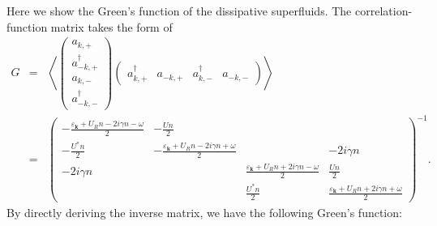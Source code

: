 \documentclass[aps,onecolumn,superscriptaddress,notitlepage,longbibliography]{revtex4-1}
\newcommand{\tmmathbf}[1]{\ensuremath{\boldsymbol{#1}}}
\begin{document}
Here we show the Green's function of the dissipative superfluids. The
correlation-function matrix takes the form of
\begin{eqnarray}
  G & = & \left\langle \left(\begin{array}{c}
    a_{k \tmmathbf{, +}}\\
    a^{\dagger}_{- k \tmmathbf{, +}}\\
    a_{k, -}\\
    a^{\dagger}_{- k, -}
  \end{array}\right) \left(\begin{array}{cccc}
    a^{\dagger}_{k, +} & a_{- k, +} & a^{\dagger}_{k, -} & a_{- k, -}
  \end{array}\right) \right\rangle \nonumber\\
  & = & \left(\begin{array}{cccc}
    - \frac{\varepsilon_{\tmmathbf{k}} + U_R n - 2 i \gamma n - \omega}{2} & -
    \frac{U n}{2} &  & \\
    - \frac{U^{\ast} n}{2} & - \frac{\varepsilon_{\tmmathbf{k}} + U_R n - 2 i
    \gamma n + \omega}{2} &  & - 2 i \gamma n\\
    - 2 i \gamma n &  & \frac{\varepsilon_{\tmmathbf{k}} + U_R n + 2 i \gamma
    n - \omega}{2} & \frac{U n}{2}\\
    &  & \frac{U^{\ast} n}{2} & \frac{\varepsilon_{\tmmathbf{k}} + U_R n + 2
    i \gamma n + \omega}{2}
  \end{array}\right)^{- 1} . 
\end{eqnarray}
By directly deriving the inverse matrix, we have the following Green's
function:
\end{document}
